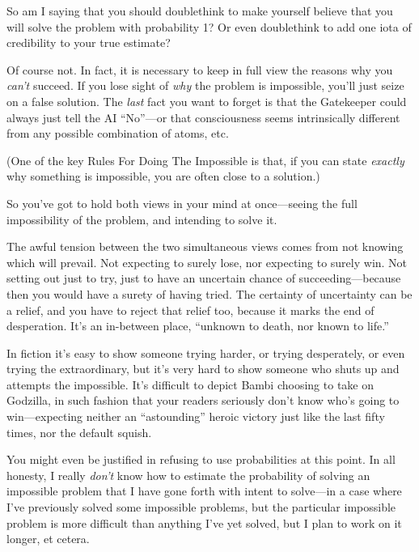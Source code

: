 {
 So am I saying that you should doublethink to make yourself
believe that you will solve the problem with probability 1? Or even
doublethink to add one iota of credibility to your true estimate?}

{
 Of course not. In fact, it is necessary to keep in full view the
reasons why you \textit{can't} succeed. If you lose
sight of \textit{why} the problem is impossible, you'll
just seize on a false solution. The \textit{last} fact you want to
forget is that the Gatekeeper could always just tell the AI
``No''---or that consciousness seems
intrinsically different from any possible combination of atoms, etc.}

{
 (One of the key Rules For Doing The Impossible is that, if you can
state \textit{exactly} why something is impossible, you are often close
to a solution.)}

{
 So you've got to hold both views in your mind at
once---seeing the full impossibility of the problem, and intending to
solve it.}

{
 The awful tension between the two simultaneous views comes from
not knowing which will prevail. Not expecting to surely lose, nor
expecting to surely win. Not setting out just to try, just to have an
uncertain chance of succeeding---because then you would have a surety
of having tried. The certainty of uncertainty can be a relief, and you
have to reject that relief too, because it marks the end of
desperation. It's an in-between place,
``unknown to death, nor known to
life.''}

{
 In fiction it's easy to show someone trying
harder, or trying desperately, or even trying the extraordinary, but
it's very hard to show someone who shuts up and
attempts the impossible. It's difficult to depict Bambi
choosing to take on Godzilla, in such fashion that your readers
seriously don't know who's going to
win---expecting neither an
``astounding'' heroic victory just
like the last fifty times, nor the default squish.}

{
 You might even be justified in refusing to use probabilities at
this point. In all honesty, I really \textit{don't}
know how to estimate the probability of solving an impossible problem
that I have gone forth with intent to solve---in a case where
I've previously solved some impossible problems, but
the particular impossible problem is more difficult than anything
I've yet solved, but I plan to work on it longer, et
cetera.}

